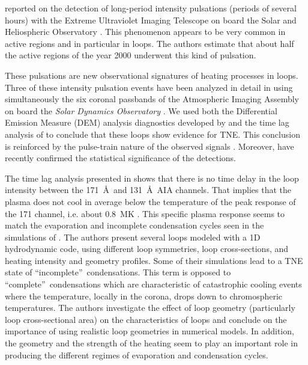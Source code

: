 \documentclass[preprint2]{aastex6}
\begin{document}
\medskip

\citet{auchere2014} reported on the detection of long-period intensity pulsations (periods of several hours) with the Extreme Ultraviolet Imaging Telescope \citep[EIT;][]{eit1995} on board the Solar and Heliospheric Observatory \citep[SoHO;][]{soho1995}. This phenomenon appears to be very common in active regions and in particular in loops. The authors estimate that about half the active regions of the year 2000 underwent this kind of pulsation.

These pulsations are new observational signatures of heating processes in loops.
Three of these intensity pulsation events have been analyzed in detail in \citet{froment2015} using simultaneously the six coronal passbands of  the Atmospheric Imaging Assembly \citep[AIA;][]{boerner2012sdo,lemen2012sdo} on board the \textit{Solar Dynamics Observatory} \citep[SDO;][] {pesnell2012sdo}. We used both the Differential Emission Measure (DEM) analysis diagnostics developed by \citet{guennou2012_1, guennou2012_2, guennou2013} and the time lag analysis of \citet{viall&klimchuk2012} to conclude that these loops show evidence for TNE. This conclusion is reinforced by the pulse-train nature of the observed signals \citep{auchere2016b}. Moreover, \citet{auchere2016a} have recently confirmed the statistical significance of the detections.


The time lag analysis presented in \citet[][see e.g. Figure~9]{froment2015} shows that there is no time delay in the loop intensity between the 171~\AA~and 131~\AA~AIA channels. That implies that the plasma does not cool in average below the temperature of the peak response of the 171 channel, i.e. about 0.8~MK \citep[see zero time lag discussions in][]{bradshaw_patterns_2016, viall_signatures_2016}. This specific plasma response seems to match the evaporation and incomplete condensation cycles seen in the simulations of \citet{mikic2013}. 
The authors present several loops modeled with a 1D hydrodynamic code, using different loop symmetries, loop cross-sections, and heating intensity and geometry profiles. Some of their simulations lead to a TNE state of \textquotedblleft incomplete\textquotedblright~condensations. This term is opposed to \textquotedblleft complete\textquotedblright~condensations which are characteristic of catastrophic cooling events where the temperature, locally in the corona, drops down to chromospheric temperatures. The authors investigate the effect of loop geometry (particularly loop cross-sectional area) on the characteristics of loops and conclude on the importance of using realistic loop geometries in numerical models. In addition, the geometry and the strength of the heating seem to play an important role in producing the different regimes of evaporation and condensation cycles.
\end{document}
